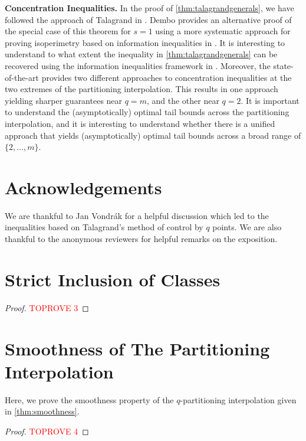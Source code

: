 \documentclass[11pt]{article}%
\numberwithin{theorem}{subsection}
\begin{document}
\noindent\textbf{Concentration Inequalities.} In the proof of \cref{thm:talagrandgenerals}, we have followed the approach of Talagrand in \cite{Talagrand96}. Dembo provides an alternative proof of the special case of this theorem for $s = 1$ using a more systematic approach 
for proving isoperimetry
based on
information inequalities in \cite{Dembo97}. It is interesting to understand to what extent the inequality in \cref{thm:talagrandgenerals} can be recovered using the information inequalities framework in \cite{Dembo97}. Moreover, the state-of-the-art provides two different approaches to concentration inequalities at the two extremes of the partitioning interpolation. This results in one approach yielding sharper guarantees near $q=m$, and the other near $q=2$. It is important to understand the (asymptotically) optimal tail bounds across the partitioning interpolation, and it is interesting to understand whether there is a unified approach that yields (asymptotically) optimal tail bounds across a broad range of $\{2,\ldots, m\}$.

\section*{Acknowledgements}
We are thankful to Jan Vondr{\'a}k for a helpful discussion which led to the inequalities based on Talagrand's method of control by $q$ points. We are also thankful to the anonymous reviewers for helpful remarks on the exposition. 

\printbibliography
\appendix

\section{Strict Inclusion of Classes}
\label{appendix:existenceproblem}
\begin{proof}\textcolor{red}{TOPROVE 3}\end{proof}


\section{Smoothness of The Partitioning Interpolation}
\label{section:properties}
Here, we prove the smoothness property of the $q$-partitioning interpolation given in \cref{thm:smoothness}. 

\begin{proof}\textcolor{red}{TOPROVE 4}\end{proof}
\end{document}
